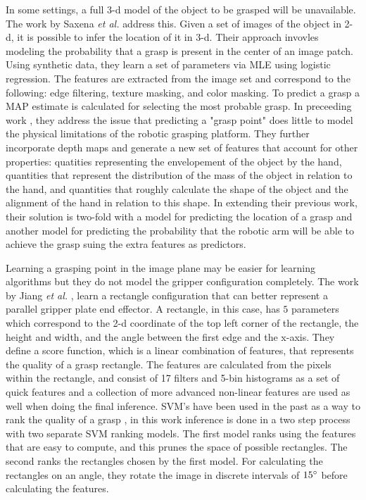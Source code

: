 \documentclass{article}
\begin{document}
In some settings, a full 3-d model of the object to be grasped will be unavailable.
The work by Saxena \textit{et al.} \cite{saxena07,saxena08} address this.
Given a set of images of the object in 2-d, it is possible to infer the location of it
in 3-d. Their
approach invovles modeling the probability that a grasp is present in the center of an
image patch. Using synthetic data, they learn a set of parameters via MLE using
logistic regression. The features are extracted from the image set and correspond to
the following: edge filtering, texture masking, and color masking. To predict a grasp
a MAP estimate is calculated for selecting the most probable grasp. In preceeding work
\cite{saxena08a}, they address the issue that predicting a "grasp point" does little to
model the physical limitations of the robotic grasping platform. They further incorporate
depth maps and generate a new set of features that account for other properties:
quatities representing the envelopement of the object by the hand, quantities that
represent the distribution of the mass of the object in relation to the hand, and
quantities that roughly calculate the shape of the object and the alignment of the hand
in relation to this shape. In extending their previous work, their solution is
two-fold with a model for predicting the location of a grasp and another model for
predicting the probability that the robotic arm will be able to achieve the grasp suing
the extra features as predictors.


Learning a grasping point in the image plane may be easier for learning algorithms
but they do not model the gripper configuration completely. The work by Jiang
\textit{et al.}
\cite{jiang11}, learn a rectangle configuration that can better represent a parallel
gripper plate end effector. A rectangle, in this case, has $5$ parameters which
correspond to the 2-d coordinate of the top left corner of the rectangle, the height
and width, and the angle between the first edge and the x-axis. They define a score
function, which is a linear combination of features, that represents the quality of
a grasp rectangle. The features are calculated from the pixels within the rectangle, and
consist of 17 filters and 5-bin histograms as a set of quick features and a collection of
more advanced non-linear features are used as well when doing the final inference.
SVM's have been used in the past as a way to rank the quality of a grasp \cite{le10},
in this work inference is done in a two step process
with two separate SVM ranking models. The first model ranks using the features that
are easy to compute, and this prunes the space of possible rectangles. The second ranks
the rectangles chosen by the first model. For calculating the rectangles on an angle,
they rotate the image in discrete intervals of $15\degree$ before calculating
the features.
\end{document}
